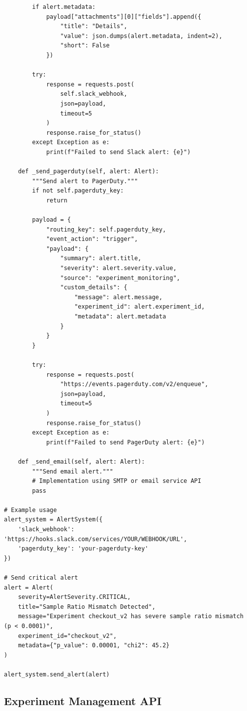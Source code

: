 \begin{lstlisting}
        if alert.metadata:
            payload["attachments"][0]["fields"].append({
                "title": "Details",
                "value": json.dumps(alert.metadata, indent=2),
                "short": False
            })

        try:
            response = requests.post(
                self.slack_webhook,
                json=payload,
                timeout=5
            )
            response.raise_for_status()
        except Exception as e:
            print(f"Failed to send Slack alert: {e}")

    def _send_pagerduty(self, alert: Alert):
        """Send alert to PagerDuty."""
        if not self.pagerduty_key:
            return

        payload = {
            "routing_key": self.pagerduty_key,
            "event_action": "trigger",
            "payload": {
                "summary": alert.title,
                "severity": alert.severity.value,
                "source": "experiment_monitoring",
                "custom_details": {
                    "message": alert.message,
                    "experiment_id": alert.experiment_id,
                    "metadata": alert.metadata
                }
            }
        }

        try:
            response = requests.post(
                "https://events.pagerduty.com/v2/enqueue",
                json=payload,
                timeout=5
            )
            response.raise_for_status()
        except Exception as e:
            print(f"Failed to send PagerDuty alert: {e}")

    def _send_email(self, alert: Alert):
        """Send email alert."""
        # Implementation using SMTP or email service API
        pass

# Example usage
alert_system = AlertSystem({
    'slack_webhook': 'https://hooks.slack.com/services/YOUR/WEBHOOK/URL',
    'pagerduty_key': 'your-pagerduty-key'
})

# Send critical alert
alert = Alert(
    severity=AlertSeverity.CRITICAL,
    title="Sample Ratio Mismatch Detected",
    message="Experiment checkout_v2 has severe sample ratio mismatch (p < 0.0001)",
    experiment_id="checkout_v2",
    metadata={"p_value": 0.00001, "chi2": 45.2}
)

alert_system.send_alert(alert)
\end{lstlisting}

\subsection{Experiment Management API}

